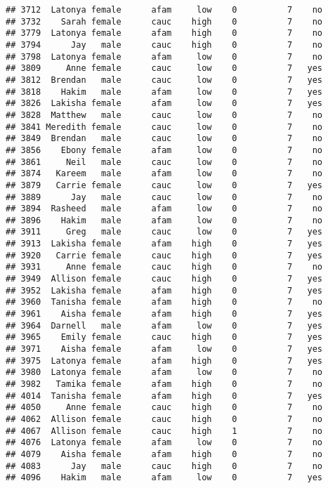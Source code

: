 \documentclass[
]{article}
\begin{document}
\begin{verbatim}
## 3712  Latonya female      afam     low    0          7    no
## 3732    Sarah female      cauc    high    0          7    no
## 3779  Latonya female      afam    high    0          7    no
## 3794      Jay   male      cauc    high    0          7    no
## 3798  Latonya female      afam     low    0          7    no
## 3809     Anne female      cauc     low    0          7   yes
## 3812  Brendan   male      cauc     low    0          7   yes
## 3818    Hakim   male      afam     low    0          7   yes
## 3826  Lakisha female      afam     low    0          7   yes
## 3828  Matthew   male      cauc     low    0          7    no
## 3841 Meredith female      cauc     low    0          7    no
## 3849  Brendan   male      cauc     low    0          7    no
## 3856    Ebony female      afam     low    0          7    no
## 3861     Neil   male      cauc     low    0          7    no
## 3874   Kareem   male      afam     low    0          7    no
## 3879   Carrie female      cauc     low    0          7   yes
## 3889      Jay   male      cauc     low    0          7    no
## 3894  Rasheed   male      afam     low    0          7    no
## 3896    Hakim   male      afam     low    0          7    no
## 3911     Greg   male      cauc     low    0          7   yes
## 3913  Lakisha female      afam    high    0          7   yes
## 3920   Carrie female      cauc    high    0          7   yes
## 3931     Anne female      cauc    high    0          7    no
## 3949  Allison female      cauc    high    0          7   yes
## 3952  Lakisha female      afam    high    0          7   yes
## 3960  Tanisha female      afam    high    0          7    no
## 3961    Aisha female      afam    high    0          7   yes
## 3964  Darnell   male      afam     low    0          7   yes
## 3965    Emily female      cauc    high    0          7   yes
## 3971    Aisha female      afam     low    0          7   yes
## 3975  Latonya female      afam    high    0          7   yes
## 3980  Latonya female      afam     low    0          7    no
## 3982   Tamika female      afam    high    0          7    no
## 4014  Tanisha female      afam    high    0          7   yes
## 4050     Anne female      cauc    high    0          7    no
## 4062  Allison female      cauc    high    0          7    no
## 4067  Allison female      cauc    high    1          7    no
## 4076  Latonya female      afam     low    0          7    no
## 4079    Aisha female      afam    high    0          7    no
## 4083      Jay   male      cauc    high    0          7    no
## 4096    Hakim   male      afam     low    0          7   yes

\end{verbatim}
\end{document}
